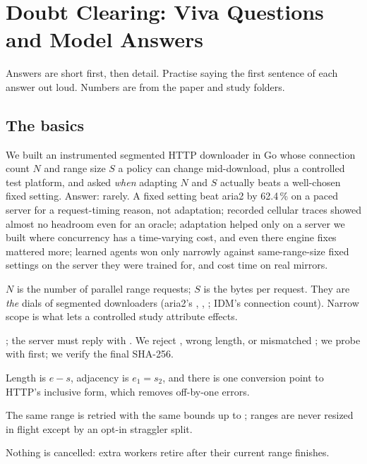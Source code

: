 \chapter{Doubt Clearing: Viva Questions and Model Answers}\label{ch:viva}
Answers are short first, then detail. Practise saying the first sentence of each answer out loud. Numbers are from the paper and study folders.

\section{The basics}
\A We built an instrumented segmented HTTP downloader in Go whose connection count $N$ and range size $S$ a policy can change mid-download, plus a controlled test platform, and asked \emph{when} adapting $N$ and $S$ actually beats a well-chosen fixed setting. Answer: rarely. A fixed setting beat aria2 by 62.4\,\% on a paced server for a request-timing reason, not adaptation; recorded cellular traces showed almost no headroom even for an oracle; adaptation helped only on a server we built where concurrency has a time-varying cost, and even there engine fixes mattered more; learned agents won only narrowly against same-range-size fixed settings on the server they were trained for, and cost time on real mirrors.

\A $N$ is the number of parallel range requests; $S$ is the bytes per request. They are \emph{the} dials of segmented downloaders (aria2's , , ; IDM's connection count). Narrow scope is what lets a controlled study attribute effects.

\A {}; the server must reply  with . We reject , wrong length, or mismatched ; we probe with  first; we verify the final SHA-256.

\A Length is $e-s$, adjacency is $e_1=s_2$, and there is one conversion point to HTTP's inclusive form, which removes off-by-one errors.

\A The same range is retried with the same bounds up to ; ranges are never resized in flight except by an opt-in straggler split.

\A Nothing is cancelled: extra workers retire after their current range finishes.

